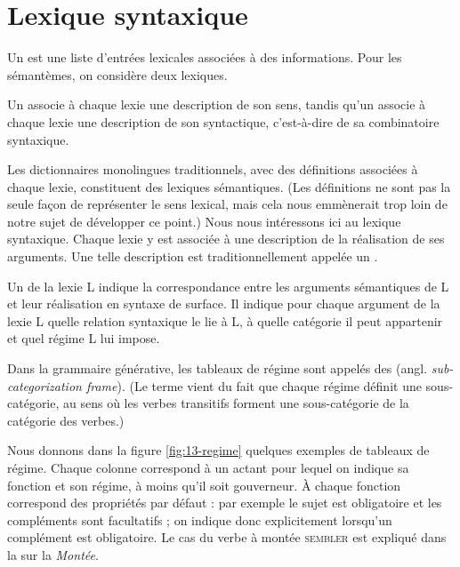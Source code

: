 \section{Lexique syntaxique}
Un  est une liste d’entrées lexicales associées à des informations. Pour les sémantèmes, on considère deux lexiques.

{Un  associe à chaque lexie une description de son sens, tandis qu’un  associe à chaque lexie une description de son syntactique, c'est-à-dire de sa combinatoire syntaxique.}

Les dictionnaires monolingues traditionnels, avec des définitions associées à chaque lexie, constituent des lexiques sémantiques. (Les définitions ne sont pas la seule façon de représenter le sens lexical, mais cela nous emmènerait trop loin de notre sujet de développer ce point.) Nous nous intéressons ici au lexique syntaxique. Chaque lexie y est associée à une description de la réalisation de ses arguments. Une telle description est traditionnellement appelée un . 

{Un  de la lexie L indique la correspondance entre les arguments sémantiques de L et leur réalisation en syntaxe de surface. Il indique pour chaque argument de la lexie L quelle relation syntaxique le lie à L, à quelle catégorie il peut appartenir et quel régime L lui impose.}

Dans la grammaire générative, les tableaux de régime sont appelés des  (angl. \textit{sub-categorization frame}). (Le terme vient du fait que chaque régime définit une sous-catégorie, au sens où les verbes transitifs forment une sous-catégorie de la catégorie des verbes.)

Nous donnons dans la figure \ref{fig:13-regime} quelques exemples de tableaux de régime. Chaque colonne correspond à un actant pour lequel on indique sa fonction et son régime, à moins qu'il soit gouverneur. À chaque fonction correspond des propriétés par défaut : par exemple le sujet est obligatoire et les compléments sont facultatifs ; on indique donc explicitement lorsqu'un complément est obligatoire. Le cas du verbe à montée \textsc{sembler} est expliqué dans la  sur la \textit{Montée}.


